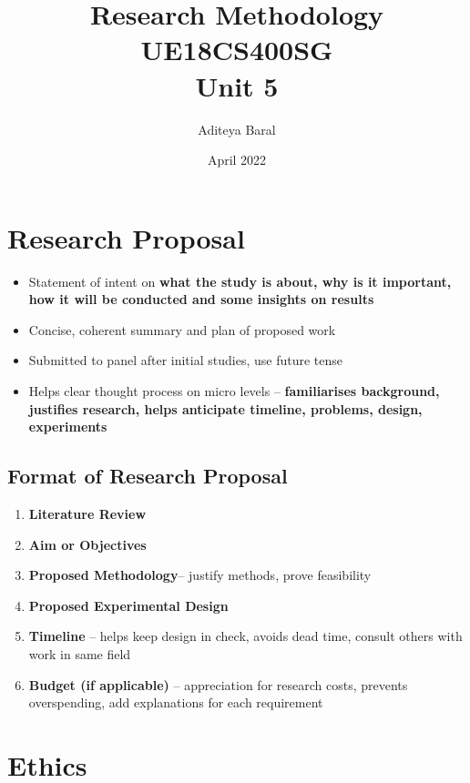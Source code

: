 \documentclass{article}
\title{Research Methodology UE18CS400SG \\ Unit 5}
\author{Aditeya Baral}
\date{April 2022}
\begin{document}
\maketitle

\section{Research Proposal}

\begin{itemize}
    \item Statement of intent on \textbf{what the study is about, why is it important, how it will be conducted and some insights on results}
    \item Concise, coherent summary and plan of proposed work
    \item Submitted to panel after initial studies, use future tense
    \item Helps clear thought process on micro levels -- \textbf{familiarises background, justifies research, helps anticipate timeline, problems, design, experiments}
\end{itemize}

\subsection{Format of Research Proposal}

\begin{enumerate}
    \item \textbf{Literature Review}
    \item \textbf{Aim or Objectives}
    \item \textbf{Proposed Methodology}-- justify methods, prove feasibility
    \item \textbf{Proposed Experimental Design}
    \item \textbf{Timeline} -- helps keep design in check, avoids dead time, consult others with work in same field
    \item \textbf{Budget (if applicable)} -- appreciation for research costs, prevents overspending, add explanations for each requirement
\end{enumerate}

\section{Ethics}
\end{document}
